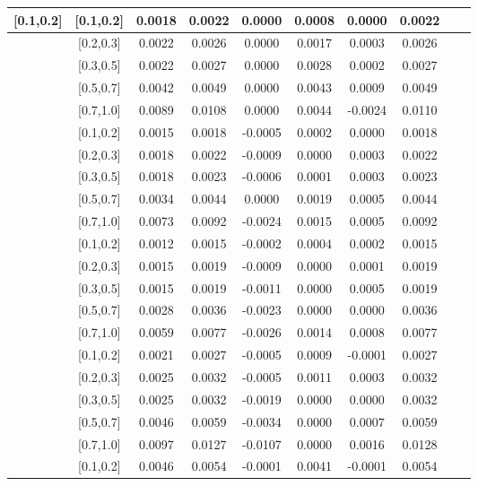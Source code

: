 \begin{table}[H]
\begin{tabular}{|c| c| c| c| c| c| c| c| c| c|}
[0.1,0.2]	&	[0.1,0.2]	&	0.0018	&	0.0022	&	0.0000	&	0.0008	&	0.0000	&	0.0022	\\ \hline
[0.1,0.2]	&	[0.2,0.3]	&	0.0022	&	0.0026	&	0.0000	&	0.0017	&	0.0003	&	0.0026	\\ \hline
[0.1,0.2]	&	[0.3,0.5]	&	0.0022	&	0.0027	&	0.0000	&	0.0028	&	0.0002	&	0.0027	\\ \hline
[0.1,0.2]	&	[0.5,0.7]	&	0.0042	&	0.0049	&	0.0000	&	0.0043	&	0.0009	&	0.0049	\\ \hline
[0.1,0.2]	&	[0.7,1.0]	&	0.0089	&	0.0108	&	0.0000	&	0.0044	&	-0.0024	&	0.0110	\\ \hline
[0.2,0.3]	&	[0.1,0.2]	&	0.0015	&	0.0018	&	-0.0005	&	0.0002	&	0.0000	&	0.0018	\\ \hline
[0.2,0.3]	&	[0.2,0.3]	&	0.0018	&	0.0022	&	-0.0009	&	0.0000	&	0.0003	&	0.0022	\\ \hline
[0.2,0.3]	&	[0.3,0.5]	&	0.0018	&	0.0023	&	-0.0006	&	0.0001	&	0.0003	&	0.0023	\\ \hline
[0.2,0.3]	&	[0.5,0.7]	&	0.0034	&	0.0044	&	0.0000	&	0.0019	&	0.0005	&	0.0044	\\ \hline
[0.2,0.3]	&	[0.7,1.0]	&	0.0073	&	0.0092	&	-0.0024	&	0.0015	&	0.0005	&	0.0092	\\ \hline
[0.3,0.5]	&	[0.1,0.2]	&	0.0012	&	0.0015	&	-0.0002	&	0.0004	&	0.0002	&	0.0015	\\ \hline
[0.3,0.5]	&	[0.2,0.3]	&	0.0015	&	0.0019	&	-0.0009	&	0.0000	&	0.0001	&	0.0019	\\ \hline
[0.3,0.5]	&	[0.3,0.5]	&	0.0015	&	0.0019	&	-0.0011	&	0.0000	&	0.0005	&	0.0019	\\ \hline
[0.3,0.5]	&	[0.5,0.7]	&	0.0028	&	0.0036	&	-0.0023	&	0.0000	&	0.0000	&	0.0036	\\ \hline
[0.3,0.5]	&	[0.7,1.0]	&	0.0059	&	0.0077	&	-0.0026	&	0.0014	&	0.0008	&	0.0077	\\ \hline
[0.5,0.7]	&	[0.1,0.2]	&	0.0021	&	0.0027	&	-0.0005	&	0.0009	&	-0.0001	&	0.0027	\\ \hline
[0.5,0.7]	&	[0.2,0.3]	&	0.0025	&	0.0032	&	-0.0005	&	0.0011	&	0.0003	&	0.0032	\\ \hline
[0.5,0.7]	&	[0.3,0.5]	&	0.0025	&	0.0032	&	-0.0019	&	0.0000	&	0.0000	&	0.0032	\\ \hline
[0.5,0.7]	&	[0.5,0.7]	&	0.0046	&	0.0059	&	-0.0034	&	0.0000	&	0.0007	&	0.0059	\\ \hline
[0.5,0.7]	&	[0.7,1.0]	&	0.0097	&	0.0127	&	-0.0107	&	0.0000	&	0.0016	&	0.0128	\\ \hline
[0.7,1.0]	&	[0.1,0.2]	&	0.0046	&	0.0054	&	-0.0001	&	0.0041	&	-0.0001	&	0.0054	\\ \hline

\end{tabular}
\end{table}
